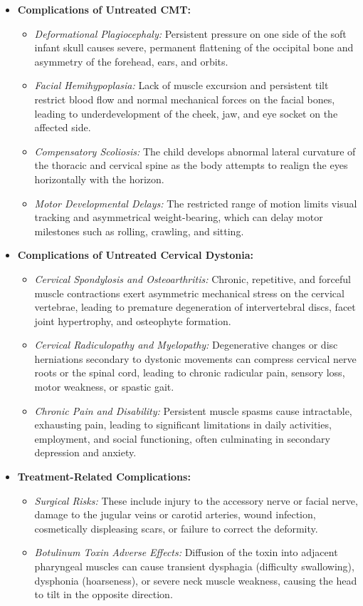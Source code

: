 \begin{itemize}
    \item \textbf{Complications of Untreated CMT:}
    \begin{itemize}
        \item \textit{Deformational Plagiocephaly:} Persistent pressure on one side of the soft infant skull causes severe, permanent flattening of the occipital bone and asymmetry of the forehead, ears, and orbits.
        \item \textit{Facial Hemihypoplasia:} Lack of muscle excursion and persistent tilt restrict blood flow and normal mechanical forces on the facial bones, leading to underdevelopment of the cheek, jaw, and eye socket on the affected side.
        \item \textit{Compensatory Scoliosis:} The child develops abnormal lateral curvature of the thoracic and cervical spine as the body attempts to realign the eyes horizontally with the horizon.
        \item \textit{Motor Developmental Delays:} The restricted range of motion limits visual tracking and asymmetrical weight-bearing, which can delay motor milestones such as rolling, crawling, and sitting.
    \end{itemize}
    \item \textbf{Complications of Untreated Cervical Dystonia:}
    \begin{itemize}
        \item \textit{Cervical Spondylosis and Osteoarthritis:} Chronic, repetitive, and forceful muscle contractions exert asymmetric mechanical stress on the cervical vertebrae, leading to premature degeneration of intervertebral discs, facet joint hypertrophy, and osteophyte formation.
        \item \textit{Cervical Radiculopathy and Myelopathy:} Degenerative changes or disc herniations secondary to dystonic movements can compress cervical nerve roots or the spinal cord, leading to chronic radicular pain, sensory loss, motor weakness, or spastic gait.
        \item \textit{Chronic Pain and Disability:} Persistent muscle spasms cause intractable, exhausting pain, leading to significant limitations in daily activities, employment, and social functioning, often culminating in secondary depression and anxiety.
    \end{itemize}
    \item \textbf{Treatment-Related Complications:}
    \begin{itemize}
        \item \textit{Surgical Risks:} These include injury to the accessory nerve or facial nerve, damage to the jugular veins or carotid arteries, wound infection, cosmetically displeasing scars, or failure to correct the deformity.
        \item \textit{Botulinum Toxin Adverse Effects:} Diffusion of the toxin into adjacent pharyngeal muscles can cause transient dysphagia (difficulty swallowing), dysphonia (hoarseness), or severe neck muscle weakness, causing the head to tilt in the opposite direction.
    \end{itemize}
\end{itemize}

